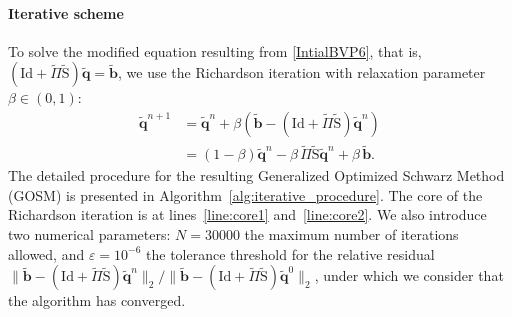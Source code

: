 \documentclass[a4paper,11pt]{article}
\newcommand{\Id}{\mathrm{Id}}
\newcommand{\mS}{\mathrm{S}}
\newcommand{\bq}{\boldsymbol{q}}
\newcommand{\bb}{\boldsymbol{b}}
\begin{document}
\paragraph{Iterative scheme} To solve the modified equation resulting from \eqref{IntialBVP6}, that is, \((\Id+\tilde{\Pi}\tilde{\mS})\tilde{\bq} = \tilde{\bb}\), we use the Richardson iteration with relaxation parameter \(\beta \in (0,1)\): 
\begin{equation}\label{eq:richardson_iterate}
  \begin{aligned}
    \tilde{\bq}^{n+1} 
    &= \tilde{\bq}^n + \beta \left(\tilde{\bb} - (\Id + \tilde{\Pi} \tilde{\mS}) \tilde{\bq}^n \right)\\
    &= (1-\beta) \tilde{\bq}^n - \beta \, \tilde{\Pi} \tilde{\mS} \tilde{\bq}^n + \beta \, \tilde{\bb}. 
  \end{aligned}
\end{equation}
The detailed procedure for the resulting Generalized Optimized Schwarz Method (GOSM) is presented in Algorithm~\ref{alg:iterative_procedure}. %
The core of the Richardson iteration is at lines~\ref{line:core1} and~\ref{line:core2}. We also introduce two numerical parameters: \(N=30000\) the maximum number of iterations allowed, and \(\varepsilon = 10^{-6}\) the tolerance threshold for the relative residual
\(
  \lVert \tilde{\bb} - (\Id + \tilde{\Pi} \tilde{\mS}) \tilde{\bq}^n \rVert_2 / \lVert \tilde{\bb} - (\Id + \tilde{\Pi} \tilde{\mS}) \tilde{\bq}^0 \rVert_2
\), under which we consider that the algorithm has converged.
\end{document}

